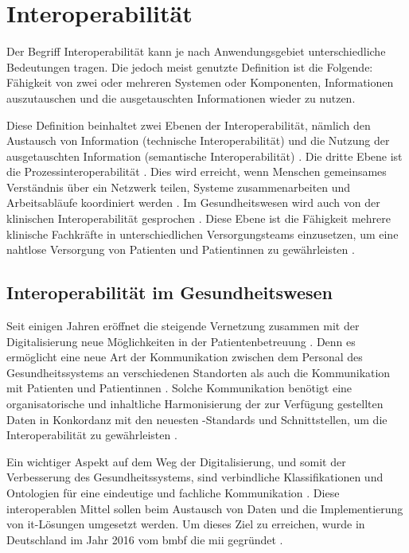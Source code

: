 \section{Interoperabilität} \label{sec:interop}

Der Begriff Interoperabilität kann je nach Anwendungsgebiet unterschiedliche Bedeutungen tragen. Die jedoch meist genutzte Definition ist die Folgende: \glqq Fähigkeit von zwei oder mehreren Systemen oder Komponenten, Informationen auszutauschen und die ausgetauschten Informationen wieder zu nutzen.\grqq{} \cite{interopdef}

Diese Definition beinhaltet zwei Ebenen der Interoperabilität, nämlich den Austausch von Information (technische Interoperabilität) und die Nutzung der ausgetauschten Information (semantische Interoperabilität) \cite{telemedizin}. Die dritte Ebene ist die Prozessinteroperabilität \cite{ehealtOk}. Dies wird erreicht, wenn Menschen gemeinsames Verständnis über ein Netzwerk teilen, Systeme zusammenarbeiten und Arbeitsabläufe koordiniert werden \cite{interop}. Im Gesundheitswesen wird auch von der klinischen Interoperabilität gesprochen \cite{ehealtOk}. Diese Ebene ist die Fähigkeit mehrere klinische Fachkräfte in unterschiedlichen Versorgungsteams einzusetzen, um eine nahtlose Versorgung von Patienten und Patientinnen zu gewährleisten \cite{interop}.

\subsection{Interoperabilität im Gesundheitswesen} \label{subsec:interopgesund}

Seit einigen Jahren eröffnet die steigende Vernetzung zusammen mit der Digitalisierung neue Möglichkeiten in der Patientenbetreuung \cite{telemedizin}. Denn es ermöglicht eine neue Art der Kommunikation zwischen dem Personal des Gesundheitssystems an verschiedenen Standorten als auch die Kommunikation mit Patienten und Patientinnen \cite{ehealtOk}. Solche Kommunikation benötigt eine organisatorische und inhaltliche Harmonisierung der zur Verfügung gestellten Daten in Konkordanz mit den neuesten -Standards und Schnittstellen, um die Interoperabilität zu gewährleisten \cite{telemedizin}. 

Ein wichtiger Aspekt auf dem Weg der Digitalisierung, und somit der Verbesserung des Gesundheitssystems, sind verbindliche Klassifikationen und Ontologien für eine eindeutige und fachliche Kommunikation \cite{ehealtOk}. Diese interoperablen Mittel sollen beim Austausch von Daten und die Implementierung von \ac{it}-Lösungen umgesetzt werden. Um dieses Ziel zu erreichen, wurde in Deutschland im Jahr 2016 vom \ac{bmbf} die \ac{mii} gegründet \cite{telemedizin}. 

